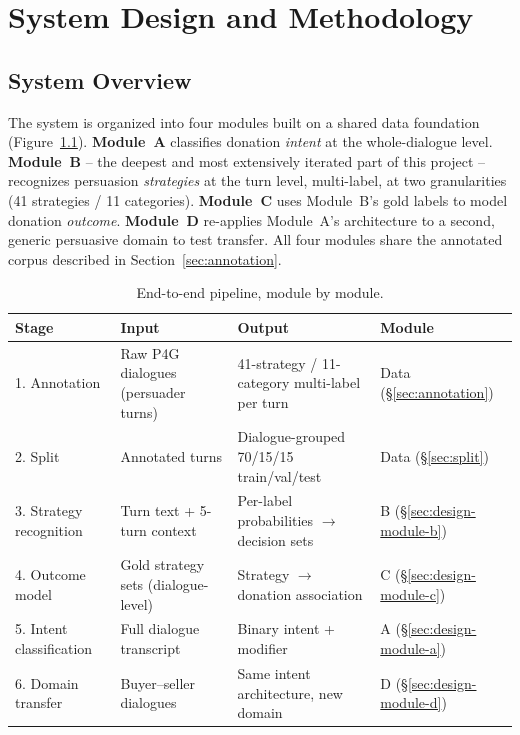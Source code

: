 \chapter{System Design and Methodology}
\label{ch:design}

\section{System Overview}

The system is organized into four modules built on a shared data foundation
(Figure~\ref{tab:pipeline}). \textbf{Module~A} classifies donation
\emph{intent} at the whole-dialogue level. \textbf{Module~B} -- the deepest
and most extensively iterated part of this project -- recognizes persuasion
\emph{strategies} at the turn level, multi-label, at two granularities (41
strategies / 11 categories). \textbf{Module~C} uses Module~B's gold labels to
model donation \emph{outcome}. \textbf{Module~D} re-applies Module~A's
architecture to a second, generic persuasive domain to test transfer. All
four modules share the annotated corpus described in
Section~\ref{sec:annotation}.

\begin{table}[H]
\centering
\caption{End-to-end pipeline, module by module.}
\label{tab:pipeline}
\begin{tabular}{@{}p{2.1cm}p{4.6cm}p{4.6cm}p{2.7cm}@{}}
\toprule
\textbf{Stage} & \textbf{Input} & \textbf{Output} & \textbf{Module} \\
\midrule
1. Annotation & Raw P4G dialogues (persuader turns) & 41-strategy / 11-category multi-label per turn & Data (\S\ref{sec:annotation}) \\
2. Split & Annotated turns & Dialogue-grouped 70/15/15 train/val/test & Data (\S\ref{sec:split}) \\
3. Strategy recognition & Turn text + 5-turn context & Per-label probabilities $\to$ decision sets & B (\S\ref{sec:design-module-b}) \\
4. Outcome model & Gold strategy sets (dialogue-level) & Strategy $\to$ donation association & C (\S\ref{sec:design-module-c}) \\
5. Intent classification & Full dialogue transcript & Binary intent + modifier & A (\S\ref{sec:design-module-a}) \\
6. Domain transfer & Buyer--seller dialogues & Same intent architecture, new domain & D (\S\ref{sec:design-module-d}) \\
\bottomrule
\end{tabular}
\end{table}

